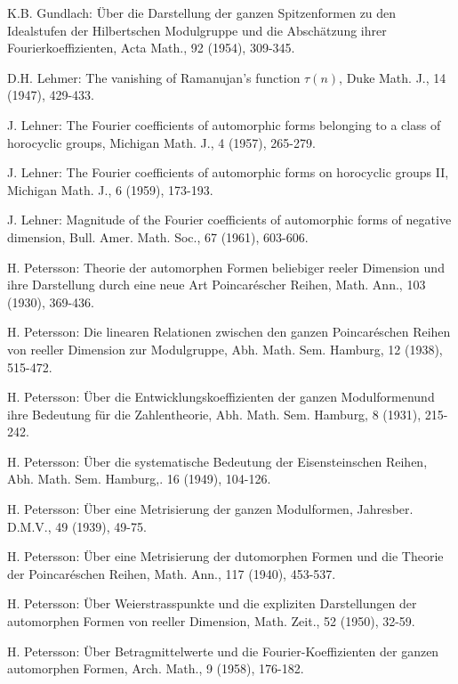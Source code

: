 \begin{thebibliography}{99}
 K.B. Gundlach: \"Uber die Darstellung der ganzen
  Spitzenformen zu den Idealstufen der Hilbertschen Modulgruppe und
  die Absch\"atzung ihrer Fourierkoeffizienten, Acta Math., 92 (1954),
  309-345. 

 D.H. Lehmer: The vanishing of Ramanujan's function
  $\tau(n)$, Duke Math. J., 14 (1947), 429-433.

 J. Lehner: The Fourier coefficients of automorphic
  forms belonging to a class of horocyclic groups, Michigan Math. J.,
  4 (1957), 265-279.

 J. Lehner: The \pageoriginale Fourier coefficients of
  automorphic forms on horocyclic groups II, Michigan Math. J., 6
  (1959),  173-193. 

 J. Lehner: Magnitude of the Fourier coefficients of
  automorphic forms of negative dimension, Bull. Amer. Math. Soc., 67
  (1961), 603-606. 

 H. Petersson: Theorie der automorphen Formen beliebiger
  reeler Dimension und ihre Darstellung durch eine neue Art
  Poincar\'escher Reihen, Math. Ann., 103 (1930), 369-436.

 H. Petersson: Die linearen Relationen zwischen den
  ganzen Poincar\'eschen Reihen von reeller Dimension zur Modulgruppe,
  Abh. Math. Sem. Hamburg, 12 (1938), 515-472.

 H. Petersson: \"Uber die Entwicklungskoeffizienten der
  ganzen Modulformenund ihre Bedeutung f\"ur die Zahlentheorie,
  Abh. Math. Sem. Hamburg, 8 (1931), 215-242.

 H. Petersson: \"Uber die systematische Bedeutung der
  Eisensteinschen Reihen, Abh. Math. Sem. Hamburg,. 16 (1949), 104-126.

 H. Petersson: \"Uber eine Metrisierung der ganzen
  Modulformen, Jahresber. D.M.V., 49 (1939), 49-75.

 H. Petersson: \"Uber eine Metrisierung der dutomorphen
  Formen und die Theorie der Poincar\'eschen Reihen, Math. Ann., 117
  (1940), 453-537.

 H. Petersson: \"Uber Weierstrasspunkte und die
  expliziten Darstellungen der automorphen Formen von reeller
  Dimension, Math. Zeit., 52 (1950), 32-59. 

 H. Petersson: \"Uber \pageoriginale Betragmittelwerte und die
  Fourier-Koeffizienten der ganzen automorphen Formen, Arch. Math., 9
  (1958), 176-182.


\end{thebibliography}
